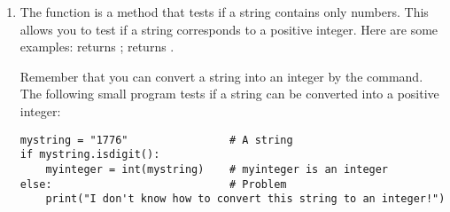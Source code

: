 \documentclass[11pt,class=report,crop=false]{standalone}
\begin{document}
\begin{cours}
\begin{enumerate}
  \item The function  is a \Python{}    method that tests if a string contains only numbers. This allows you to test if a string corresponds to a positive integer.
 Here are some examples:  returns ;  returns .
 
 Remember that you can convert a string into an integer by the  command. The following small program tests if a string can be converted into a positive integer:
 
\begin{lstlisting}
mystring = "1776"                # A string
if mystring.isdigit():
    myinteger = int(mystring)    # myinteger is an integer
else:                            # Problem
    print("I don't know how to convert this string to an integer!")
\end{lstlisting} 

\end{enumerate}  
\end{cours}

\end{document}
